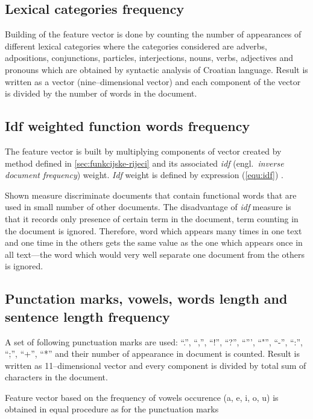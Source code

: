 \documentclass[11pt,english]{article}
\newcommand{\engl}[1]{(engl.~\emph{#1})}
\begin{document}
\begin{multicols}{2}
\subsection{Lexical categories frequency}
\label{sec:rijeci-grupe}
Building of the feature vector is done by counting the number of appearances of
different lexical categories where the categories considered are adverbs,
adpositions, conjunctions, particles, interjections, nouns, verbs, adjectives and
pronouns which are obtained by syntactic analysis of Croatian language. Result is
written as a vector (nine--dimensional vector) and each component of the vector
is divided by the number of words in the document.

\subsection{Idf weighted function words frequency}
\label{sec:funkcijske-rijeci-idf}
The feature vector is built by multiplying components of vector created by method
defined in \ref{sec:funkcijske-rijeci} and its associated \emph{idf}
\engl{inverse document frequency} weight. \emph{Idf} weight is defined by
expression (\ref{equ:idf}) \citep{diederich2003authorship}.

Shown measure discriminate documents that contain functional words that are used
in small number of other documents. The disadvantage of \emph{idf} measure is
that it records only presence of certain term in the document, term
counting in the document is ignored. Therefore, word which appears many times in
one text and one time in the others gets the same value as the one which appears
once in all text---the word which would very well separate one document from the
others is ignored.

\subsection{Punctation marks, vowels, words length and sentence length
frequency}
\label{sec:znacajke-manje}
A set of following punctuation marks are used: ``.'', ``,'', ``!'', ``?'',
``''', ``"'', ``-'', ``:'', ``;'', ``+'', ``*'' and their number of appearance in
document is counted. Result is written as 11--dimensional vector and every
component is divided by total sum of characters in the document.

Feature vector based on the frequency of vowels occurence (a, e, i, o, u) is
obtained in equal procedure as for the punctuation marks


\end{multicols}
\end{document}
